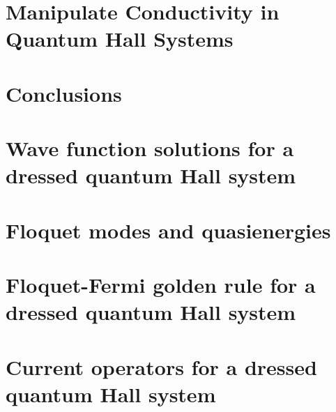\documentclass[
 reprint,
 amsmath,amssymb,
 aps,
 prb,
]{revtex4-2}
\begin{document}
\section{\label{sec_manipulate_conductivity} Manipulate Conductivity in Quantum Hall Systems}


\section{\label{sec_conclusions} Conclusions}


\begin{acknowledgments}

\end{acknowledgments}

\appendix

\section{\label{appendix_a} Wave function solutions for a dressed quantum Hall system}


\section{\label{appendix_b} Floquet modes and quasienergies}


\section{\label{appendix_c} Floquet-Fermi golden rule for a dressed quantum  Hall system}


\section{\label{appendix_d} Current operators for a dressed quantum Hall system}



\end{document}
